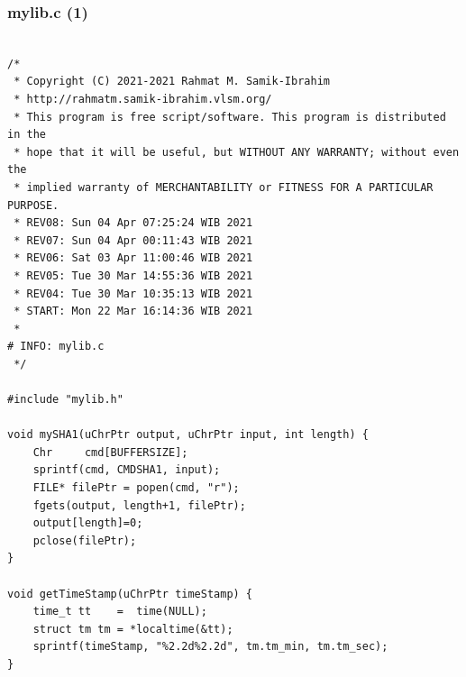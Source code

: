 \documentclass[xcolor=table, notheorems, hyperref={pdfpagelabels=false}]{beamer}
\begin{document}
\begin{frame}[fragile]
\frametitle{mylib.c (1)}
\begin{lstlisting}[basicstyle=\ttfamily\tiny]         % 108

/*
 * Copyright (C) 2021-2021 Rahmat M. Samik-Ibrahim
 * http://rahmatm.samik-ibrahim.vlsm.org/
 * This program is free script/software. This program is distributed in the 
 * hope that it will be useful, but WITHOUT ANY WARRANTY; without even the 
 * implied warranty of MERCHANTABILITY or FITNESS FOR A PARTICULAR PURPOSE.
 * REV08: Sun 04 Apr 07:25:24 WIB 2021
 * REV07: Sun 04 Apr 00:11:43 WIB 2021
 * REV06: Sat 03 Apr 11:00:46 WIB 2021
 * REV05: Tue 30 Mar 14:55:36 WIB 2021
 * REV04: Tue 30 Mar 10:35:13 WIB 2021
 * START: Mon 22 Mar 16:14:36 WIB 2021
 *
# INFO: mylib.c
 */

#include "mylib.h"

void mySHA1(uChrPtr output, uChrPtr input, int length) {
    Chr     cmd[BUFFERSIZE];
    sprintf(cmd, CMDSHA1, input);
    FILE* filePtr = popen(cmd, "r");
    fgets(output, length+1, filePtr);
    output[length]=0;
    pclose(filePtr);
}

void getTimeStamp(uChrPtr timeStamp) {
    time_t tt    =  time(NULL);
    struct tm tm = *localtime(&tt);
    sprintf(timeStamp, "%2.2d%2.2d", tm.tm_min, tm.tm_sec);
}

\end{lstlisting}
\end{frame}
\end{document}

